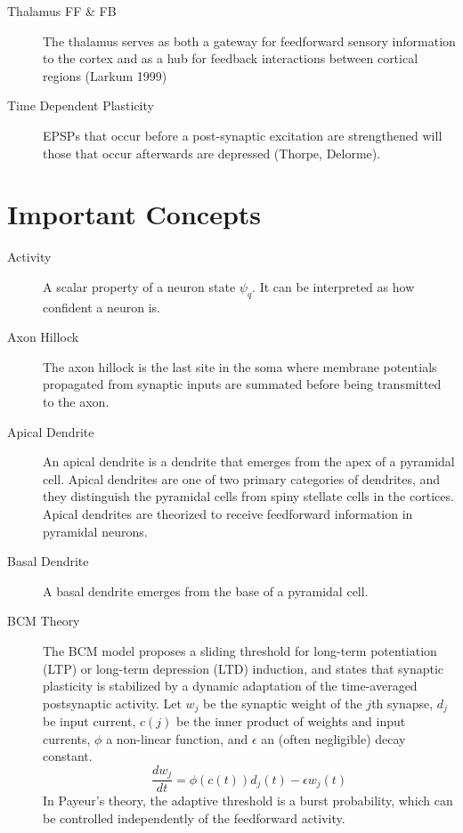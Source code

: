 \documentclass[11pt, a4paper]{article}
\begin{document}
\begin{description}
    \item[Thalamus FF \& FB] The thalamus serves as both a gateway for feedforward sensory information to the cortex and as a hub for feedback interactions between cortical regions (Larkum 1999)

    \item[Time Dependent Plasticity] EPSPs that occur before a post-synaptic excitation are strengthened will those that occur afterwards are depressed (Thorpe, Delorme).
    
\end{description}

\section{Important Concepts}
\begin{description}
    \item[Activity] A scalar property of a neuron state $\psi_q$. It can be interpreted as how confident a neuron is.

    \item[Axon Hillock] The axon hillock is the last site in the soma where membrane potentials propagated from synaptic inputs are summated before being transmitted to the axon.

    \item[Apical Dendrite] An apical dendrite is a dendrite that emerges from the apex of a pyramidal cell. Apical dendrites are one of two primary categories of dendrites, and they distinguish the pyramidal cells from spiny stellate cells in the cortices. Apical dendrites are theorized to receive feedforward information in pyramidal neurons.

    \item[Basal Dendrite] A basal dendrite emerges from the base of a pyramidal cell.

    \item[BCM Theory] The BCM model proposes a sliding threshold for long-term potentiation (LTP) or long-term depression (LTD) induction, and states that synaptic plasticity is stabilized by a dynamic adaptation of the time-averaged postsynaptic activity. Let $w_j$ be the synaptic weight of the $j$th synapse, $d_j$ be input current, $c(j)$ be the inner product of weights and input currents, $\phi$ a non-linear function, and $\epsilon$ an (often negligible) decay constant. 
    \begin{equation}
        \frac{dw_j}{dt} = \phi(c(t))d_j(t) - \epsilon w_j(t)
    \end{equation}
    In Payeur's theory, the adaptive threshold is a burst probability, which can be controlled independently of the feedforward activity.


\end{description}
\end{document}
